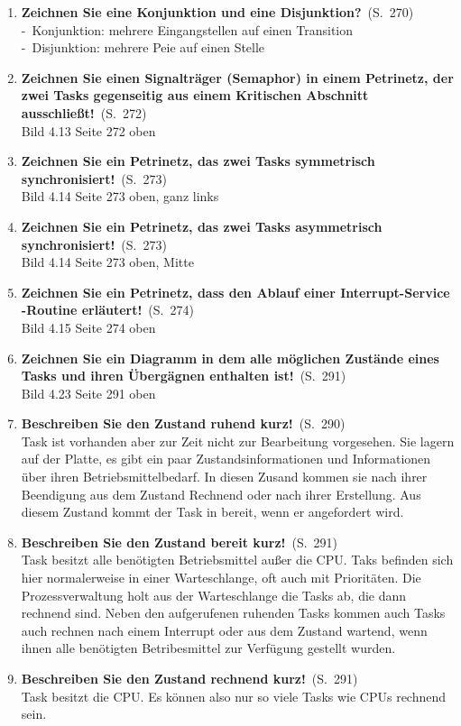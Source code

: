 \documentclass[a4paper,12pt]{article}
\newcommand{\question}[3]{\pagebreak[3]\item {\textbf{#1?}}\ (S.\ #2)#3}
\newcommand{\statement}[3]{\pagebreak[3]\item {\textbf{#1!}}\ (S.\ #2)#3}
\newcommand{\catchword}[1]{\\-\ #1}
\newcommand{\normaltext}[1]{\\#1}
\newcommand{\page}[1]{#1}
\begin{document}
\begin{enumerate}
  
  \question{Zeichnen Sie eine Konjunktion und eine Disjunktion}{\page{270}}
  {
    \catchword{Konjunktion: mehrere Eingangstellen auf einen Transition}
    \catchword{Disjunktion: mehrere Peie auf einen Stelle}
  }
  
  
  \statement{Zeichnen Sie einen Signalträger (Semaphor) in einem Petrinetz,
  der zwei Tasks gegenseitig aus einem Kritischen Abschnitt ausschließt}
  {\page{272}}
  {
    \normaltext{Bild 4.13 Seite 272 oben}
  }
  
  \statement{Zeichnen Sie ein Petrinetz, das zwei Tasks symmetrisch 
  synchronisiert}
      {\page{273}}
  {
    \normaltext{Bild 4.14 Seite 273 oben, ganz links}
  }
  
  \statement{Zeichnen Sie ein Petrinetz, das zwei Tasks asymmetrisch 
  synchronisiert}
      {\page{273}}
  {
    \normaltext{Bild 4.14 Seite 273 oben, Mitte}
  }
  
  \statement{Zeichnen Sie ein Petrinetz, dass den Ablauf einer Interrupt-Service
  -Routine erläutert}
      {\page{274}}
  {
    \normaltext{Bild 4.15 Seite 274 oben}
  }
  
  
  \statement{Zeichnen Sie ein Diagramm in dem alle möglichen Zustände eines
  Tasks und ihren Übergägnen enthalten ist}
      {\page{291}}
  {
    \normaltext{Bild 4.23 Seite 291 oben}
  }
  
  \statement{Beschreiben Sie den Zustand ruhend kurz}
      {\page{290}}
  {
    \normaltext{Task ist vorhanden aber zur Zeit nicht zur Bearbeitung
    vorgesehen. Sie lagern auf der Platte, es gibt ein paar Zustandsinformationen
    und Informationen über ihren Betriebsmittelbedarf. In diesen Zusand kommen
    sie nach ihrer Beendigung aus dem Zustand Rechnend oder nach ihrer 
    Erstellung. Aus diesem Zustand kommt der Task in bereit, wenn er angefordert
    wird.}
  }
  
  \statement{Beschreiben Sie den Zustand bereit kurz}
      {\page{291}}
  {
  \normaltext{Task besitzt alle benötigten Betriebsmittel außer die CPU. Taks 
  befinden sich hier normalerweise in einer Warteschlange, oft auch mit
  Prioritäten. Die Prozessverwaltung holt aus der Warteschlange die Tasks ab,
  die dann rechnend sind. Neben den aufgerufenen ruhenden Tasks kommen auch 
  Tasks auch rechnen nach einem Interrupt oder aus dem Zustand wartend, wenn
  ihnen alle benötigten Betribesmittel zur Verfügung gestellt wurden.}
  }
  
\statement{Beschreiben Sie den Zustand rechnend kurz}
      {\page{291}}
  {
  \normaltext{Task besitzt die CPU. Es können also nur so viele Tasks wie CPUs 
  rechnend sein. }
  }  
  

\end{enumerate}
\end{document}
